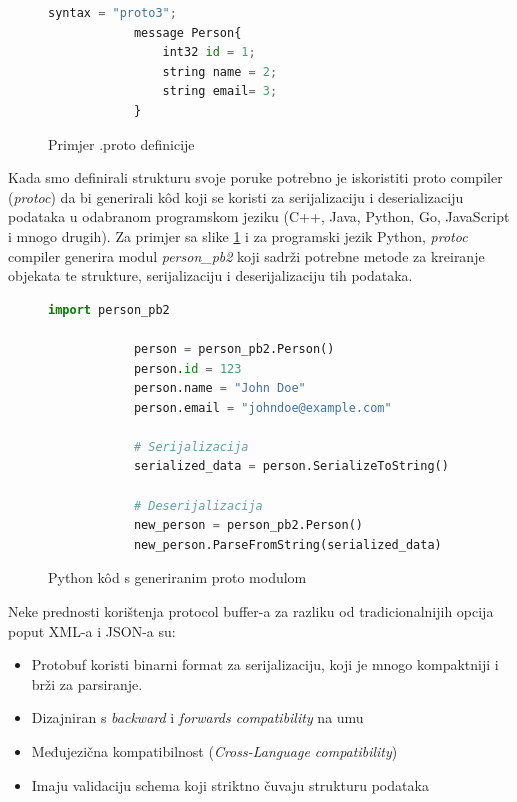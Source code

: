 \documentclass[zavrsnirad]{fer}
\begin{document}
\begin{figure}[H]
	\centering
	\begin{minipage}{0.6\linewidth}
		\begin{lstlisting}[language=Python]
			syntax = "proto3";
			message Person{
				int32 id = 1;
				string name = 2;
				string email= 3;
			}
		\end{lstlisting}
	\end{minipage}
	\caption{Primjer .proto definicije}
	\label{slk:proto}
\end{figure}		


	Kada smo definirali strukturu svoje poruke potrebno je iskoristiti proto compiler (\textit{protoc}) da bi generirali k\^od koji se koristi za serijalizaciju i deserializaciju podataka u odabranom programskom jeziku (C++, Java, Python, Go, JavaScript i mnogo drugih). Za primjer sa slike \ref{slk:proto} i za programski jezik Python, \textit{protoc} compiler generira modul \textit{person\_pb2} koji sadrži potrebne metode za kreiranje objekata te strukture, serijalizaciju i deserijalizaciju tih podataka. 

\begin{figure}[H]
	\centering
	\begin{minipage}{0.8\linewidth}
		\begin{lstlisting}[language=Python]
			import person_pb2
			
			person = person_pb2.Person()
			person.id = 123
			person.name = "John Doe"
			person.email = "johndoe@example.com"
			
			# Serijalizacija
			serialized_data = person.SerializeToString()
			
			# Deserijalizacija
			new_person = person_pb2.Person()
			new_person.ParseFromString(serialized_data)
		\end{lstlisting}
	\end{minipage}
	\caption{Python k\^od s generiranim proto modulom}
	\label{slk:proto_kod}
\end{figure}

Neke prednosti korištenja protocol buffer-a za razliku od tradicionalnijih opcija poput XML-a i JSON-a su:

\begin{itemize}
	\item Protobuf koristi binarni format za serijalizaciju, koji je mnogo kompaktniji i brži za parsiranje.
	\item Dizajniran s \textit{backward} i \textit{forwards compatibility} na umu 
	\item Međujezična kompatibilnost (\textit{Cross-Language compatibility})
	\item Imaju validaciju schema koji striktno čuvaju strukturu podataka
\end{itemize}
\end{document}

